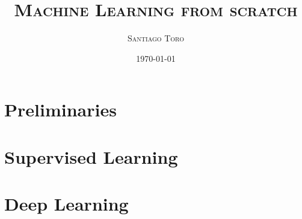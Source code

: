 \documentclass[leqno,dvipsnames,11pt]{article}
\title{\Large \textbf{ \textsc{Machine Learning from scratch}}}
\author{\textsc{Santiago Toro}}
\date{\normalsize \today}
\begin{document}
	
\maketitle

\begin{abstract}
	\lipsum[1]
\end{abstract}
	
\setcounter{tocdepth}{4}
\setcounter{secnumdepth}{4}
\tableofcontents
\cleardoublepage	


	\part{Preliminaries}
	
	
	
	\cleardoublepage
	\part{Supervised Learning}
	
		
	
	\cleardoublepage
	\part{Deep Learning}\label{part:deep_learning}
	
	
	
	

%	
%	
%	
%	
%	
%	
%	
	\cleardoublepage
	\printbibliography
\end{document}
